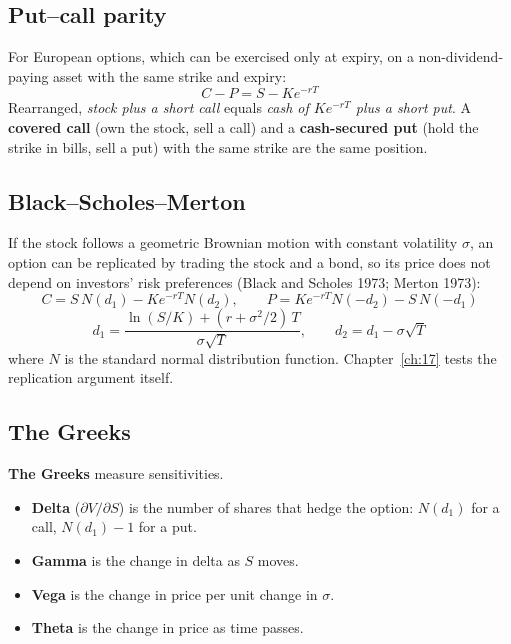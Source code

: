 \subsection{Put--call parity}

For European options, which can be exercised only at expiry, on a non-dividend-paying asset with the same strike and expiry:
\begin{equation}
  C - P = S - K e^{-rT}
  \label{eq:16-parity}
\end{equation}
Rearranged, \emph{stock plus a short call} equals \emph{cash of $Ke^{-rT}$ plus a short put}. A \textbf{covered call} (own the stock, sell a call) and a \textbf{cash-secured put} (hold the strike in bills, sell a put) with the same strike are the same position.

\subsection{Black--Scholes--Merton}
\label{sec:16-bsm}

If the stock follows a geometric Brownian motion with constant volatility $\sigma$, an option can be replicated by trading the stock and a bond, so its price does not depend on investors' risk preferences (Black and Scholes 1973; Merton 1973):
\begin{equation}
  C = S\,N(d_1) - K e^{-rT} N(d_2), \qquad P = K e^{-rT} N(-d_2) - S\,N(-d_1)
  \label{eq:16-bs}
\end{equation}
\begin{equation}
  d_1 = \frac{\ln(S/K) + (r + \sigma^2/2)\,T}{\sigma\sqrt{T}}, \qquad d_2 = d_1 - \sigma\sqrt{T}
  \label{eq:16-d}
\end{equation}
where $N$ is the standard normal distribution function. Chapter~\ref{ch:17} tests the replication argument itself.

\subsection{The Greeks}
\label{sec:16-greeks}

\textbf{The Greeks} measure sensitivities.

\begin{itemize}
  \item \textbf{Delta} ($\partial V/\partial S$) is the number of shares that hedge the option: $N(d_1)$ for a call, $N(d_1) - 1$ for a put.
  \item \textbf{Gamma} is the change in delta as $S$ moves.
  \item \textbf{Vega} is the change in price per unit change in $\sigma$.
  \item \textbf{Theta} is the change in price as time passes.
\end{itemize}

